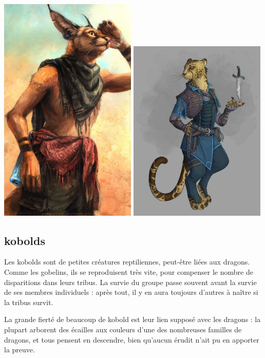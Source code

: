 \documentclass[10pt,a4paper]{book}
\begin{document}
\includegraphics[width=0.49\textwidth]{khajit 2}
\includegraphics[width=0.49\textwidth]{khajit 3}
\subsection{kobolds}
Les kobolds sont de petites créatures reptiliennes, peut-être liées aux dragons. Comme les gobelins, ils se reproduisent très vite, pour compenser le nombre de disparitions dans leurs tribus.
La survie du groupe passe souvent avant la survie de ses membres individuels : après tout, il y en aura toujours d'autres à naître si la tribus survit.

La grande fierté de beaucoup de kobold est leur lien supposé avec les dragons : la plupart arborent des écailles aux couleurs d'une des nombreuses familles de dragons, et tous pensent en descendre, bien qu'aucun érudit n'ait pu en apporter la preuve.
\end{document}
